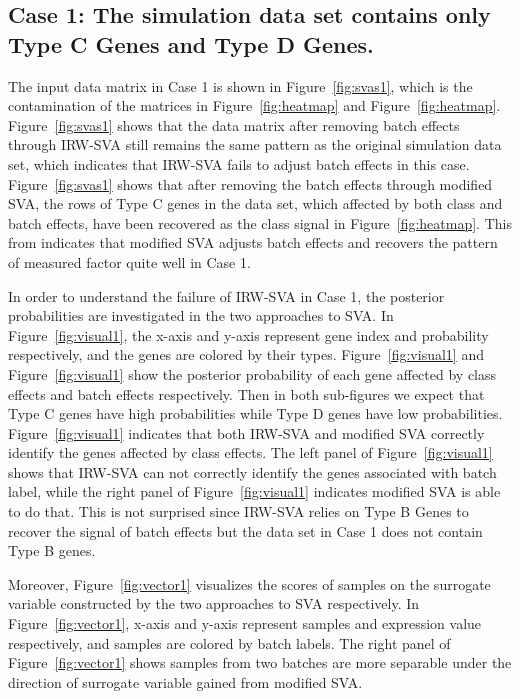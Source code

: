\documentclass[11pt]{article}
\begin{document}
\subsection{Case 1: The simulation data set contains only Type C Genes and Type D Genes.}

The input data matrix in Case 1 is shown in Figure~\ref{fig:svas1}, which is the contamination of the matrices in Figure~\ref{fig:heatmap} and Figure~\ref{fig:heatmap}. Figure~\ref{fig:svas1} shows that the data matrix after removing batch effects through IRW-SVA still remains the same pattern as the original simulation data set, which indicates that IRW-SVA fails to adjust batch effects in this case. Figure~\ref{fig:svas1} shows that after removing the batch effects through modified SVA, the rows of Type C genes in the data set, which affected by both class and batch effects, have been recovered as the class signal in Figure~\ref{fig:heatmap}. This from indicates that modified SVA adjusts batch effects and recovers the pattern of measured factor quite well in Case 1. 

In order to understand the failure of IRW-SVA in Case 1, the posterior probabilities are investigated in the two approaches to SVA. In Figure~\ref{fig:visual1}, the x-axis and y-axis represent gene index and probability respectively, and the genes are colored by their types. Figure~\ref{fig:visual1} and Figure~\ref{fig:visual1} show the posterior probability of each gene affected by class effects and batch effects respectively. Then in both sub-figures we expect that Type C genes have high probabilities while Type D genes have low probabilities. Figure~\ref{fig:visual1} indicates that both IRW-SVA and modified SVA correctly identify the genes affected by class effects. The left panel of Figure~\ref{fig:visual1} shows that IRW-SVA can not correctly identify the genes associated with batch label, while the right panel of Figure~\ref{fig:visual1} indicates modified SVA is able to do that. This is not surprised since IRW-SVA relies on Type B Genes to recover the signal of batch effects but the data set in Case 1 does not contain Type B genes.

Moreover, Figure~\ref{fig:vector1} visualizes the scores of samples on the surrogate variable constructed by the two approaches to SVA respectively. In Figure~\ref{fig:vector1}, x-axis and y-axis represent samples and expression value respectively, and samples are colored by batch labels. The right panel of Figure~\ref{fig:vector1} shows samples from two batches are more separable under the direction of surrogate variable gained from modified SVA. 
\end{document}
